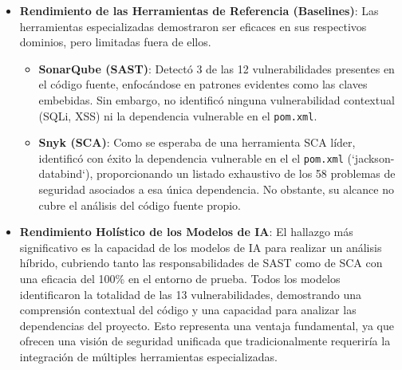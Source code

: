 \begin{itemize}
    \item \textbf{Rendimiento de las Herramientas de Referencia (Baselines)}: Las herramientas especializadas demostraron ser eficaces en sus respectivos dominios, pero limitadas fuera de ellos.
        \begin{itemize}
            \item \textbf{SonarQube (SAST)}: Detectó 3 de las 12 vulnerabilidades presentes en el código fuente, enfocándose en patrones evidentes como las claves embebidas. Sin embargo, no identificó ninguna vulnerabilidad contextual (SQLi, XSS) ni la dependencia vulnerable en el \texttt{pom.xml}.
            \item \textbf{Snyk (SCA)}: Como se esperaba de una herramienta SCA líder, identificó con éxito la dependencia vulnerable en el el \texttt{pom.xml} (`jackson-databind`), proporcionando un listado exhaustivo de los 58 problemas de seguridad asociados a esa única dependencia. No obstante, su alcance no cubre el análisis del código fuente propio.
        \end{itemize}

    \item \textbf{Rendimiento Holístico de los Modelos de IA}: El hallazgo más significativo es la capacidad de los modelos de IA para realizar un análisis híbrido, cubriendo tanto las responsabilidades de SAST como de SCA con una eficacia del 100\% en el entorno de prueba. Todos los modelos identificaron la totalidad de las 13 vulnerabilidades, demostrando una comprensión contextual del código y una capacidad para analizar las dependencias del proyecto. Esto representa una ventaja fundamental, ya que ofrecen una visión de seguridad unificada que tradicionalmente requeriría la integración de múltiples herramientas especializadas.


\end{itemize}
